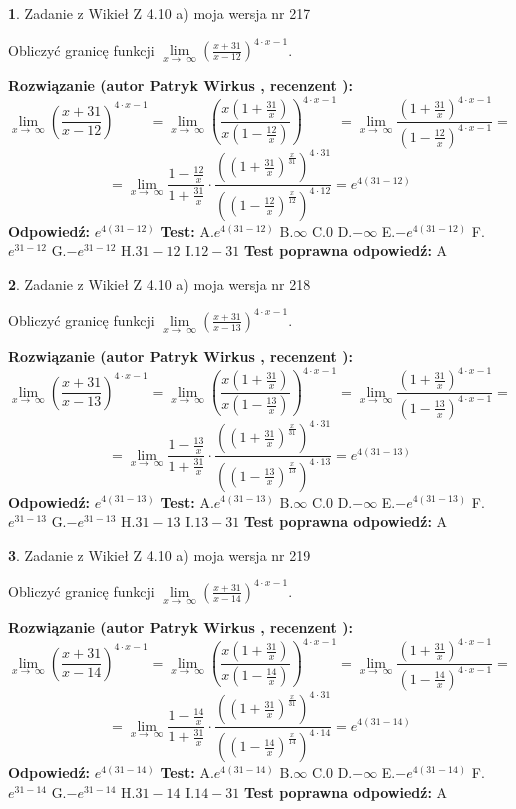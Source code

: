 \documentclass[12pt, a4paper]{article}
\theoremstyle{definition} %
\newtheorem{zad}{}
\newcommand{\zadStart}[1]{\begin{zad}#1\newline}
\newcommand{\zadStop}{\end{zad}}
\newcommand{\rozwStart}[2]{\noindent \textbf{Rozwiązanie (autor #1 , recenzent #2): }\newline}
\newcommand{\rozwStop}{\newline}
\newcommand{\odpStart}{\noindent \textbf{Odpowiedź:}\newline}
\newcommand{\odpStop}{\newline}
\newcommand{\testStart}{\noindent \textbf{Test:}\newline}
\newcommand{\testStop}{\newline}
\newcommand{\kluczStart}{\noindent \textbf{Test poprawna odpowiedź:}\newline}
\newcommand{\kluczStop}{\newline}
\begin{document}
\zadStart{Zadanie z Wikieł Z 4.10 a) moja wersja nr 217}


Obliczyć granicę funkcji  $\lim\limits_{x\to\ \infty}(\frac{x+31}{x-12})^{4\cdot x-1}$.
\zadStop
\rozwStart{Patryk Wirkus}{}
$$\lim\limits_{x\to\ \infty}(\frac{x+31}{x-12})^{4\cdot x-1} = \lim\limits_{x\to\ \infty}(\frac{x(1+\frac{31}{x})}{x(1-\frac{12}{x})})^{4\cdot x-1}=\lim\limits_{x\to\ \infty}\frac{(1+\frac{31}{x})^{4\cdot x-1}}{(1-\frac{12}{x})^{4\cdot x-1}}=$$
$$=\lim\limits_{x\to\ \infty}\frac{1-\frac{12}{x}}{1+\frac{31}{x}}\cdot\frac{((1+\frac{31}{x})^{\frac{x}{31}})^{4\cdot31}}{((1-\frac{12}{x})^{\frac{x}{12}})^{4\cdot12}}=e^{4(31-12)}$$
\rozwStop
\odpStart
$e^{4(31-12)}$
\odpStop
\testStart
A.$e^{4(31-12)}$ B.$\infty$ C.$0$ D.$-\infty$ E.$-e^{4(31-12)}$
F.$e^{31-12}$ G.$-e^{31-12}$
H.$31-12$
I.$12-31$
\testStop
\kluczStart
A
\kluczStop



\zadStart{Zadanie z Wikieł Z 4.10 a) moja wersja nr 218}


Obliczyć granicę funkcji  $\lim\limits_{x\to\ \infty}(\frac{x+31}{x-13})^{4\cdot x-1}$.
\zadStop
\rozwStart{Patryk Wirkus}{}
$$\lim\limits_{x\to\ \infty}(\frac{x+31}{x-13})^{4\cdot x-1} = \lim\limits_{x\to\ \infty}(\frac{x(1+\frac{31}{x})}{x(1-\frac{13}{x})})^{4\cdot x-1}=\lim\limits_{x\to\ \infty}\frac{(1+\frac{31}{x})^{4\cdot x-1}}{(1-\frac{13}{x})^{4\cdot x-1}}=$$
$$=\lim\limits_{x\to\ \infty}\frac{1-\frac{13}{x}}{1+\frac{31}{x}}\cdot\frac{((1+\frac{31}{x})^{\frac{x}{31}})^{4\cdot31}}{((1-\frac{13}{x})^{\frac{x}{13}})^{4\cdot13}}=e^{4(31-13)}$$
\rozwStop
\odpStart
$e^{4(31-13)}$
\odpStop
\testStart
A.$e^{4(31-13)}$ B.$\infty$ C.$0$ D.$-\infty$ E.$-e^{4(31-13)}$
F.$e^{31-13}$ G.$-e^{31-13}$
H.$31-13$
I.$13-31$
\testStop
\kluczStart
A
\kluczStop



\zadStart{Zadanie z Wikieł Z 4.10 a) moja wersja nr 219}


Obliczyć granicę funkcji  $\lim\limits_{x\to\ \infty}(\frac{x+31}{x-14})^{4\cdot x-1}$.
\zadStop
\rozwStart{Patryk Wirkus}{}
$$\lim\limits_{x\to\ \infty}(\frac{x+31}{x-14})^{4\cdot x-1} = \lim\limits_{x\to\ \infty}(\frac{x(1+\frac{31}{x})}{x(1-\frac{14}{x})})^{4\cdot x-1}=\lim\limits_{x\to\ \infty}\frac{(1+\frac{31}{x})^{4\cdot x-1}}{(1-\frac{14}{x})^{4\cdot x-1}}=$$
$$=\lim\limits_{x\to\ \infty}\frac{1-\frac{14}{x}}{1+\frac{31}{x}}\cdot\frac{((1+\frac{31}{x})^{\frac{x}{31}})^{4\cdot31}}{((1-\frac{14}{x})^{\frac{x}{14}})^{4\cdot14}}=e^{4(31-14)}$$
\rozwStop
\odpStart
$e^{4(31-14)}$
\odpStop
\testStart
A.$e^{4(31-14)}$ B.$\infty$ C.$0$ D.$-\infty$ E.$-e^{4(31-14)}$
F.$e^{31-14}$ G.$-e^{31-14}$
H.$31-14$
I.$14-31$
\testStop
\kluczStart
A
\kluczStop
\end{document}
